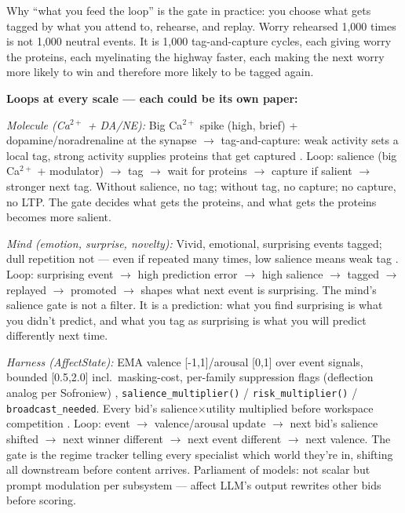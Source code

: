 \documentclass[11pt]{article}
\begin{document}
Why ``what you feed the loop'' is the gate in practice: you choose what gets tagged by what you attend to, rehearse, and replay. Worry rehearsed 1,000 times is not 1,000 neutral events. It is 1,000 tag-and-capture cycles, each giving worry the proteins, each myelinating the highway faster, each making the next worry more likely to win and therefore more likely to be tagged again.

\textbf{Loops at every scale --- each could be its own paper:}

\textit{Molecule (Ca$^{2+}$ + DA/NE):} Big Ca$^{2+}$ spike (high, brief) + dopamine/noradrenaline at the synapse $\to$\allowbreak{} tag-and-capture: weak activity sets a local tag, strong activity supplies proteins that get captured \citep{tononi2014}. Loop: salience (big Ca$^{2+}$ + modulator) $\to$\allowbreak{} tag $\to$\allowbreak{} wait for proteins $\to$\allowbreak{} capture if salient $\to$\allowbreak{} stronger next tag. Without salience, no tag; without tag, no capture; no capture, no LTP. The gate decides what gets the proteins, and what gets the proteins becomes more salient.

\textit{Mind (emotion, surprise, novelty):} Vivid, emotional, surprising events tagged; dull repetition not --- even if repeated many times, low salience means weak tag \citep{seth2021,sofroniew2026}. Loop: surprising event $\to$\allowbreak{} high prediction error $\to$\allowbreak{} high salience $\to$\allowbreak{} tagged $\to$\allowbreak{} replayed $\to$\allowbreak{} promoted $\to$\allowbreak{} shapes what next event is surprising. The mind's salience gate is not a filter. It is a prediction: what you find surprising is what you didn't predict, and what you tag as surprising is what you will predict differently next time.

\textit{Harness (AffectState):} EMA valence [-1,1]/arousal [0,1] over event signals, bounded [0.5,2.0] incl.\ masking-cost, per-family suppression flags (deflection analog per Sofroniew) \citep{sofroniew2026}, \texttt{salience\_multiplier()} / \texttt{risk\_multiplier()} / \texttt{broadcast\_needed}. Every bid's salience$\times$utility multiplied before workspace competition \citep{nayebi2026}. Loop: event $\to$\allowbreak{} valence/arousal update $\to$\allowbreak{} next bid's salience shifted $\to$\allowbreak{} next winner different $\to$\allowbreak{} next event different $\to$\allowbreak{} next valence. The gate is the regime tracker telling every specialist which world they're in, shifting all downstream before content arrives. Parliament of models: not scalar but prompt modulation per subsystem --- affect LLM's output rewrites other bids before scoring.
\end{document}
